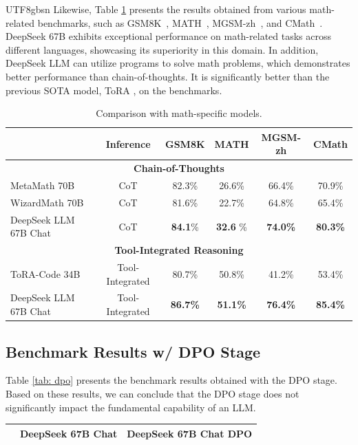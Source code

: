 \documentclass[11pt, a4paper, logo, copyright, nonumbering]{deepseek}
\begin{document}
\begin{CJK*}{UTF8}{gbsn}
Likewise, Table \ref{table:math_results} presents the results obtained from various math-related benchmarks, such as GSM8K~\citep{gsm8k}, MATH~\citep{hendrycks2021measuring}, MGSM-zh~\citep{mgsm}, and CMath~\citep{wei2023cmath}. DeepSeek 67B exhibits exceptional performance on math-related tasks across different languages, showcasing its superiority in this domain. In addition, DeepSeek LLM can utilize programs to solve math problems, which demonstrates better performance than chain-of-thoughts. It is significantly better than the previous SOTA model, ToRA \citep{tora}, on the benchmarks. 

\begin{table}[h]
\centering
\small
\begin{tabular}{lccccc}
\toprule
&\textbf{Inference} & \textbf{GSM8K} & \textbf{MATH} & \textbf{MGSM-zh} & \textbf{CMath} \\
         \midrule
            \multicolumn{6}{c}{\bf{Chain-of-Thoughts}} \\
            \midrule
MetaMath 70B \citep{metamath} & CoT & 82.3\% & 26.6\% & 66.4\% & 70.9\% \\ 
WizardMath 70B \citep{wizardmath} & CoT  & 81.6\% & 22.7\% & 64.8\% & 65.4\% \\ 
DeepSeek LLM 67B Chat &CoT                & \textbf{84.1}\%         & \textbf{32.6} \%        & \textbf{74.0\%}           & \textbf{80.3\%}                    \\ 
            \midrule
            \multicolumn{6}{c}{\bf{Tool-Integrated Reasoning}} \\
            \midrule
ToRA-Code 34B \citep{tora} & Tool-Integrated & 80.7\% & 50.8\% & 41.2\% & 53.4\% \\ 
DeepSeek LLM 67B Chat  & Tool-Integrated & \textbf{86.7\%} & \textbf{51.1\%}        & \textbf{76.4\%}           & \textbf{85.4\%}                  \\ \bottomrule
\end{tabular}
\caption{\centering Comparison with math-specific models. \label{table:math_results}}

\end{table}



\subsection{Benchmark Results w/ DPO Stage}
Table \ref{tab: dpo} presents the benchmark results obtained with the DPO stage. Based on these results, we can conclude that the DPO stage does not significantly impact the fundamental capability of an LLM.
\begin{table}[h]
    \centering \small
\begin{tabular}{lcc}
\toprule
& DeepSeek 67B Chat & DeepSeek 67B Chat DPO \\ \midrule


\end{tabular}
\end{table}
\end{CJK*}
\end{document}

